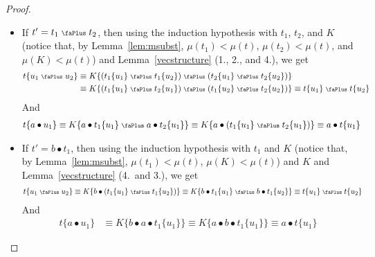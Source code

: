 \documentclass[screen, sigconf,authorversion,nonacm]{acmart}
\theoremstyle{acmdefinition}
\numberwithin{equation}{section}
\newcommand\plus{\mathrel{\text{\normalfont\scalebox{0.7}{\faPlus}}}}
\begin{document}
\begin{proof}
\begin{itemize}
    \item If $t' = t_1 \plus t_2$, then using the induction hypothesis
      with $t_1$, $t_2$, and $K$ (notice that, by Lemma~\ref{lem:msubst}, $\mu(t_1) < \mu(t)$, $\mu(t_2) <
      \mu(t)$, and $\mu(K) < \mu(t)$) and Lemma~\ref{vecstructure} (1.,
      2., and 4.), we get
      \begin{align*}
	t\{u_1 \plus u_2\}
&	\equiv K\{(t_1\{u_1\} \plus t_1\{u_2\})
	\plus (t_2\{u_1\} \plus t_2\{u_2\})\}\\
	&\equiv 
	K\{( t_1\{u_1\} \plus t_2\{u_1\})
	\plus (t_1\{u_2\} \plus t_2\{u_2\})\}
	\equiv  
	t\{u_1\} \plus t\{u_2\}
      \end{align*}
      And 
      \begin{align*}
	t\{a \bullet u_1\}
&	\equiv K\{a \bullet t_1\{u_1\} \plus a \bullet t_2\{u_1\}\}
	\equiv K\{a \bullet (t_1\{u_1\} \plus t_2\{u_1\})\}
	\equiv 
	a \bullet t\{u_1\}
      \end{align*}

    \item
      If $t' = b \bullet t_1$, then using the induction hypothesis
      with $t_1$ and $K$ (notice that, by Lemma~\ref{lem:msubst}, $\mu(t_1) < \mu(t)$, $\mu(K) < \mu(t)$) and
      $K$ and Lemma~\ref{vecstructure} (4.~and 3.), we get
      \begin{align*}
	t\{u_1 \plus u_2\}
	\equiv K\{b \bullet (t_1 \{u_1\} \plus t_1\{u_2\})\}
	& \equiv K\{b \bullet t_1 \{u_1\} \plus b \bullet t_1\{u_2\}\}
	 \equiv 
	t\{u_1\} \plus t\{u_2\}
      \end{align*}
      And 
      \begin{align*}
	t\{a \bullet u_1\}
&	\equiv K\{b \bullet a \bullet t_1 \{u_1\}\}
\equiv K\{a \bullet b \bullet t_1 \{u_1\}\}
	\equiv 
	a \bullet t\{u_1\}
      \end{align*}


\end{itemize}
\end{proof}
\end{document}
